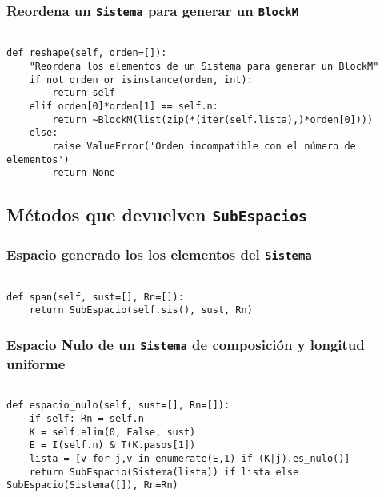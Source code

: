 \documentclass[11pt]{report}
\begin{document}
\subsubsection{Reordena un \texttt{Sistema} para generar un \texttt{BlockM}}
\label{sec:org68ef6c6}

\begin{verbatim}
   
def reshape(self, orden=[]):
    "Reordena los elementos de un Sistema para generar un BlockM"
    if not orden or isinstance(orden, int):
        return self
    elif orden[0]*orden[1] == self.n:
        return ~BlockM(list(zip(*(iter(self.lista),)*orden[0])))
    else:
        raise ValueError('Orden incompatible con el número de elementos')
        return None

\end{verbatim}

\subsection{Métodos que devuelven \texttt{SubEspacios}}
\label{sec:orgbdc7534}
\subsubsection{Espacio generado los los elementos del \texttt{Sistema}}
\label{sec:org9fb7cd6}


\begin{verbatim}

def span(self, sust=[], Rn=[]):
    return SubEspacio(self.sis(), sust, Rn)

\end{verbatim}

\subsubsection{Espacio Nulo de un \texttt{Sistema} de composición y longitud uniforme}
\label{sec:org55d941f}


\begin{verbatim}

def espacio_nulo(self, sust=[], Rn=[]):
    if self: Rn = self.n
    K = self.elim(0, False, sust)
    E = I(self.n) & T(K.pasos[1])
    lista = [v for j,v in enumerate(E,1) if (K|j).es_nulo()]
    return SubEspacio(Sistema(lista)) if lista else SubEspacio(Sistema([]), Rn=Rn)

\end{verbatim}
\end{document}
